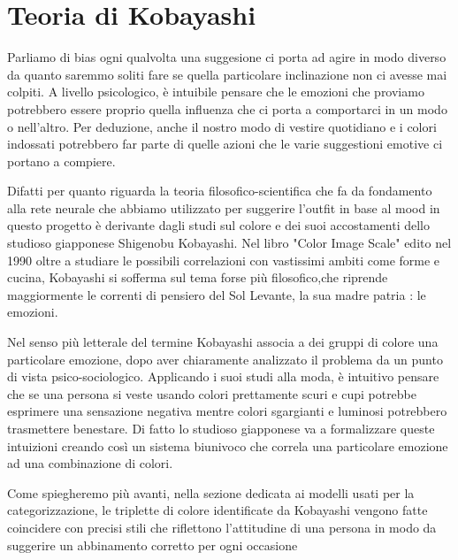 \chapter{Teoria di Kobayashi}\label{ch:teoria}

Parliamo di bias ogni qualvolta una suggesione ci porta ad agire in modo diverso da quanto saremmo soliti fare se quella particolare inclinazione non ci avesse mai colpiti. A livello psicologico, è intuibile pensare che le emozioni che proviamo potrebbero essere proprio quella influenza che ci porta a comportarci in un modo o nell'altro. Per deduzione, anche il nostro modo di vestire quotidiano e i colori indossati potrebbero far parte di quelle azioni che le varie suggestioni emotive ci portano a compiere.

Difatti per quanto riguarda la teoria filosofico-scientifica che fa da fondamento alla rete neurale che abbiamo utilizzato per suggerire l'outfit in base al mood in questo progetto è derivante dagli studi sul colore e dei suoi accostamenti dello studioso giapponese Shigenobu Kobayashi. Nel libro "Color Image Scale" edito nel 1990 oltre a studiare le possibili correlazioni con vastissimi ambiti come forme e cucina, Kobayashi si sofferma sul tema forse più filosofico,che riprende maggiormente le correnti di pensiero del Sol Levante, la sua madre patria : le emozioni.

Nel senso più letterale del termine Kobayashi associa a dei gruppi di colore una particolare emozione, dopo aver chiaramente analizzato il problema da un punto di vista psico-sociologico. Applicando i suoi studi alla moda, è intuitivo pensare che se una persona si veste usando colori prettamente scuri e cupi potrebbe esprimere una sensazione negativa mentre colori sgargianti  e luminosi potrebbero trasmettere benestare. Di fatto lo studioso giapponese va a formalizzare queste intuizioni creando così un sistema biunivoco che correla una particolare emozione ad una combinazione di colori.

Come spiegheremo più avanti, nella sezione dedicata ai modelli usati per la categorizzazione, le triplette di colore identificate da Kobayashi vengono fatte coincidere con precisi stili che riflettono l'attitudine di una persona in modo da suggerire un abbinamento corretto per ogni occasione
